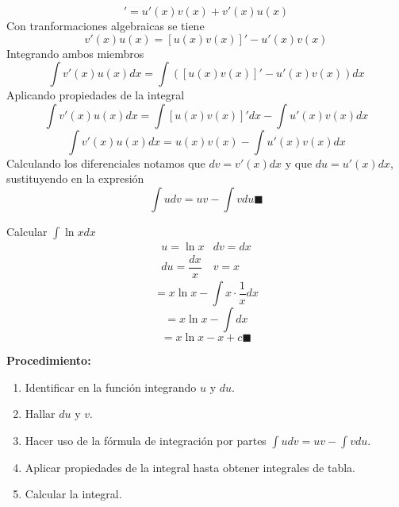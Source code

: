 \documentclass[10pt,twoside]{SelfArx} %
\begin{document}
 \begin{equation}
 [u(x)v(x)]'=u'(x)v(x)+v'(x)u(x)
 \end{equation}
 Con tranformaciones algebraicas se tiene
 \begin{equation}
 v'(x)u(x)= [u(x)v(x)]'-u'(x)v(x)
 \end{equation}
 Integrando ambos miembros
\begin{equation}
\int v'(x)u(x)dx= \int \left ([u(x)v(x)]'-u'(x)v(x)\right )dx
\end{equation}
 Aplicando propiedades de la integral
 \begin{equation}
 \int v'(x)u(x)dx= \int[u(x)v(x)]'dx-\int u'(x)v(x)dx
 \end{equation}
 \begin{equation}
 \int v'(x)u(x)dx= u(x)v(x)-\int u'(x)v(x)dx
 \end{equation}
Calculando los diferenciales notamos que $ dv=v'(x)dx $ y que $ du=u'(x)dx $, sustituyendo en la expresión
\begin{equation}
 \int udv= uv-\int vdu\blacksquare
\end{equation}
 \begin{ejemplo}
 	Calcular $ \int \ln x dx $
\[  	\begin{array}{ll}
 		 u=\ln x  &  dv=dx \\
 		 du=\dfrac{dx}{x}  &  v=x 
 	\end{array}
 \] 
 \begin{equation}
= x\ln x-\int x\cdot\dfrac{1}{x}dx
 \end{equation}
 \begin{equation}
 =x\ln x-\int dx
 \end{equation}
 \begin{equation}
= x\ln x-x+c\blacksquare
 \end{equation}
 
 
 
 
 \end{ejemplo}
 \textbf{Procedimiento:}\\
 \begin{enumerate}
 	\item Identificar en la funci\'on integrando $ u $ y $ du $.
 	\item Hallar $ du $ y $ v $.
 	\item Hacer uso de la fórmula de integración por partes $  \int udv= uv-\int vdu $.
 	\item Aplicar propiedades de la integral hasta obtener integrales de tabla.
 	\item Calcular la integral.
 \end{enumerate}
 
\end{document}

